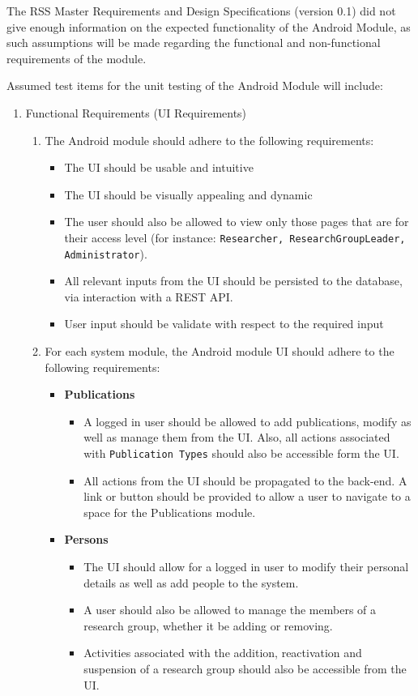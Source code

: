 The RSS Master Requirements and Design Specifications (version 0.1) did not give enough information on the expected functionality of the Android Module, as such assumptions will be made regarding the functional and non-functional requirements of the module.

Assumed test items for the unit testing of the Android Module will include:
\begin{enumerate}
	\item Functional Requirements (UI Requirements)
		
		\begin{enumerate}
			\item The Android module should adhere to the following requirements:
			\begin{itemize}
				\item The UI should be usable and intuitive
				\item The UI should be visually appealing and dynamic
				\item  The user should also be allowed to view only those pages that are for their access level (for instance: \texttt{Researcher, ResearchGroupLeader, Administrator}).
				\item All relevant inputs from the UI should be persisted to the database, via interaction with a REST API.
				\item User input should be validate with respect to the required input
			\end{itemize}
			
			\item For each system module, the Android module UI should adhere to the following requirements:
			
			\begin{itemize}
				\item \textbf{Publications}
					\begin{itemize}
						\item A logged in user should be allowed to add publications, modify as well as manage them from the UI. Also, all actions associated with \texttt{Publication Types} should also be accessible form the UI.
						\item All actions from the UI should be propagated to the back-end. A link or button should be provided to allow a user to navigate to a space for the Publications module.
					\end{itemize}
					
				\item \textbf{Persons}
					\begin{itemize}
						\item The UI should allow for a logged in user to modify their personal details as well as add people to the system.
						\item A user should also be allowed to manage the members of a research group, whether it be adding or removing.
						\item Activities associated with the addition, reactivation and suspension of a research group should also be accessible from the UI.
						

\end{itemize}
\end{itemize}
\end{enumerate}
\end{enumerate}
